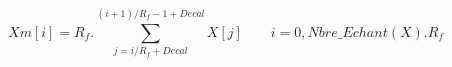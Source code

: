 \[
Xm[i] = R_f . \sum_{j = i/R_f + Decal}^{(i+1)/R_f -1 + Decal} X[j]
\qquad i=0,Nbre\_Echant(X). R_f
\]
